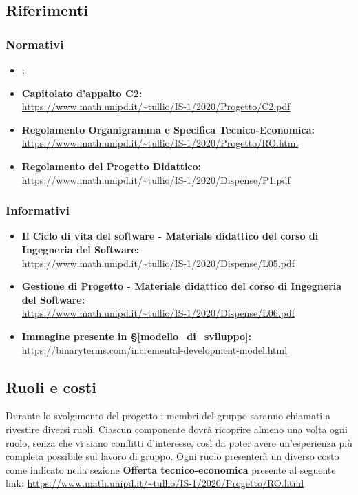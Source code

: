 \subsection{Riferimenti}
\subsubsection{Normativi}
\begin{itemize}
    \item \textit{};
    \item \textbf{Capitolato d'appalto C2:}\\
    \url{https://www.math.unipd.it/~tullio/IS-1/2020/Progetto/C2.pdf}
    \item \textbf{Regolamento Organigramma e Specifica Tecnico-Economica:}\\
    \url{https://www.math.unipd.it/~tullio/IS-1/2020/Progetto/RO.html}
    \item \textbf{Regolamento del Progetto Didattico:}\\
    \url{https://www.math.unipd.it/~tullio/IS-1/2020/Dispense/P1.pdf}
\end{itemize}

\subsubsection{Informativi}
\begin{itemize}
    \item \textbf{Il Ciclo di vita del software - Materiale didattico del corso di Ingegneria del Software:}\\
    \url{https://www.math.unipd.it/~tullio/IS-1/2020/Dispense/L05.pdf}
    \item \textbf{Gestione di Progetto - Materiale didattico del corso di Ingegneria del Software:}\\
    \url{https://www.math.unipd.it/~tullio/IS-1/2020/Dispense/L06.pdf}
    \item \textbf{Immagine presente in \S\ref{modello_di_sviluppo}:}\\
    \url{https://binaryterms.com/incremental-development-model.html}
\end{itemize}

\subsection{Ruoli e costi}
Durante lo svolgimento del progetto i membri del gruppo {\Gruppo} saranno chiamati a rivestire diversi ruoli. Ciascun componente dovrà ricoprire almeno una volta ogni ruolo, senza che vi siano conflitti d'interesse, così da poter avere un'esperienza più completa possibile sul lavoro di gruppo. Ogni ruolo presenterà un diverso costo come indicato nella sezione \textbf{Offerta tecnico-economica} presente al seguente link: \url{https://www.math.unipd.it/~tullio/IS-1/2020/Progetto/RO.html}

